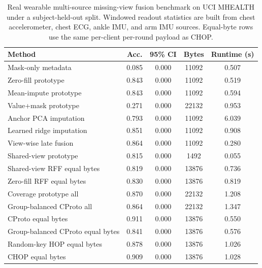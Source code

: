 \begin{table}[t]
\centering
\caption{Real wearable multi-source missing-view fusion benchmark on UCI MHEALTH under a subject-held-out split. Windowed readout statistics are built from chest accelerometer, chest ECG, ankle IMU, and arm IMU sources. Equal-byte rows use the same per-client per-round payload as CHOP.}
\label{tab:if-mhealth-fusion}
\scriptsize
\setlength{\tabcolsep}{3pt}
\renewcommand{\arraystretch}{0.94}
\begin{tabular}{lcccc}
\toprule
Method & Acc. & 95\% CI & Bytes & Runtime (s) \\
\midrule
Mask-only metadata & 0.085 & 0.000 & 11092 & 0.507 \\
Zero-fill prototype & 0.843 & 0.000 & 11092 & 0.519 \\
Mean-impute prototype & 0.843 & 0.000 & 11092 & 0.594 \\
Value+mask prototype & 0.271 & 0.000 & 22132 & 0.953 \\
Anchor PCA imputation & 0.793 & 0.000 & 11092 & 6.039 \\
Learned ridge imputation & 0.851 & 0.000 & 11092 & 0.908 \\
View-wise late fusion & 0.864 & 0.000 & 11092 & 0.280 \\
Shared-view prototype & 0.815 & 0.000 & 1492 & 0.055 \\
Shared-view RFF equal bytes & 0.819 & 0.000 & 13876 & 0.736 \\
Zero-fill RFF equal bytes & 0.830 & 0.000 & 13876 & 0.819 \\
Coverage prototype all & 0.870 & 0.000 & 22132 & 1.208 \\
Group-balanced CProto all & 0.864 & 0.000 & 22132 & 1.347 \\
CProto equal bytes & 0.911 & 0.000 & 13876 & 0.550 \\
Group-balanced CProto equal bytes & 0.841 & 0.000 & 13876 & 0.576 \\
Random-key HOP equal bytes & 0.878 & 0.000 & 13876 & 1.026 \\
CHOP equal bytes & 0.909 & 0.000 & 13876 & 1.028 \\
\bottomrule
\end{tabular}
\end{table}
